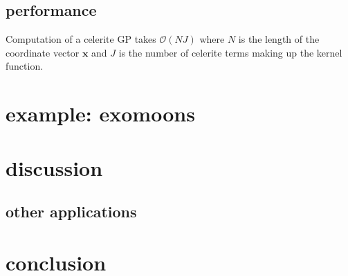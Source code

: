 \documentclass[modern]{aastex62}
\newcommand{\project}[1]{\textsf{#1}}
\newcommand{\celerite}{\project{celerite }}
\newcommand{\bvec}[1]{{\ensuremath{\boldsymbol{#1}}}}
\begin{document}
	\subsection{performance}
	Computation of a \celerite GP takes $\mathcal{O}(NJ)$ where $N$ is the length of the coordinate vector $\bvec{x}$ and $J$ is the number of 
	\celerite terms making up the kernel function. 
	
	
\section{example: exomoons}

\section{discussion}
	\subsection{other applications}

\section{conclusion}

\acknowledgments

%




\end{document}
